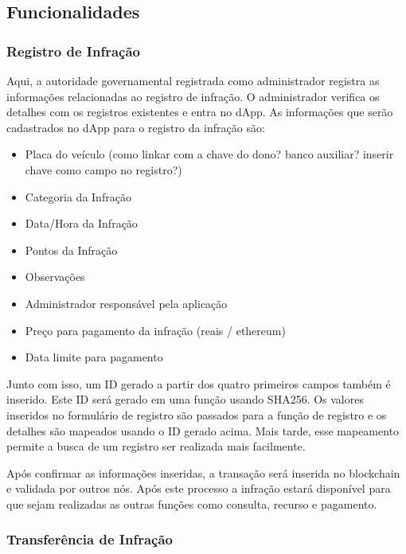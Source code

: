 \subsection{Funcionalidades}

    \subsubsection{Registro de Infração}
    
        Aqui, a autoridade governamental registrada como administrador registra as informações relacionadas ao registro de infração. O administrador verifica os detalhes com os registros existentes e entra no dApp. As informações que serão cadastrados no dApp para o registro da infração são:
        
        \begin{itemize}
            \item Placa do veículo (como linkar com a chave do dono? banco auxiliar? inserir chave como campo no registro?)
            \item Categoria da Infração
            \item Data/Hora da Infração
            \item Pontos da Infração
            \item Observações
            \item Administrador responsável pela aplicação
            \item Preço para pagamento da infração (reais / ethereum)
            \item Data limite para pagamento
        \end{itemize}
    
        Junto com isso, um ID gerado a partir dos quatro primeiros campos também é inserido. Este ID será gerado em uma função usando SHA256. Os valores inseridos no formulário de registro são passados para a função de registro e os detalhes são mapeados usando o ID gerado acima. Mais tarde, esse mapeamento permite a busca de um registro ser realizada mais facilmente.
        
        Após confirmar as informações inseridas, a transação será inserida no blockchain e validada por outros nós. Após este processo a infração estará disponível para que sejam realizadas as outras funções como consulta, recurso e pagamento.
        
            
    \subsubsection{Transferência de Infração}
    
